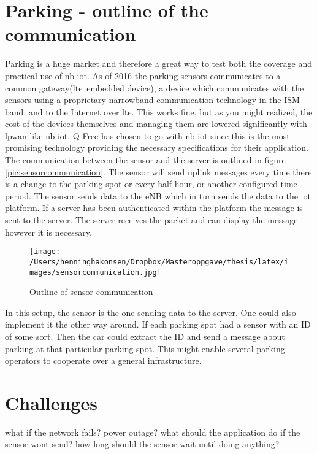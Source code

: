 \documentclass[USenglish]{ifimaster}  %
\begin{document}
\section{Parking - outline of the communication}
Parking is a huge market and therefore a great way to test both the coverage and practical use of \acrshort{nb-iot}. As of 2016 the parking sensors communicates to a common gateway(\acrshort{lte} embedded device), a device which communicates with the sensors using a proprietary narrowband communication technology in the ISM band, and to the Internet over \acrshort{lte}. This works fine, but as you might realized, the cost of the devices themselves and managing them are lowered significantly with \acrshort{lpwan} like \acrshort{nb-iot}. Q-Free has chosen to go with \acrshort{nb-iot} since this is the most promising technology providing the necessary specifications for their application. The communication between the sensor and the server is outlined in figure \vref{pic:sensorcommunication}. The sensor will send uplink messages every time there is a change to the parking spot or every half hour, or another configured time period. The sensor sends data to the eNB which in turn sends the data to the \acrshort{iot} platform. If a server has been authenticated within the platform the message is sent to the server. The server receives the packet and can display the message however it is necessary.

\begin{figure}[ht]
  \centering\texttt{[image: /Users/henninghakonsen/Dropbox/Masteroppgave/thesis/latex/images/sensorcommunication.jpg]}
  \caption{Outline of sensor communication \cite{person:ola}}
  \label{pic:sensorcommunication}
\end{figure}

In this setup, the sensor is the one sending data to the server. One could also implement it the other way around. If each parking spot had a sensor with an ID of some sort. Then the car could extract the ID and send a message about parking at that particular parking spot. This might enable several parking operators to cooperate over a general infrastructure. %

\section{Challenges}
what if the network fails?
power outage?
what should the application do if the sensor wont send?
how long should the sensor wait until doing anything?
\end{document}
